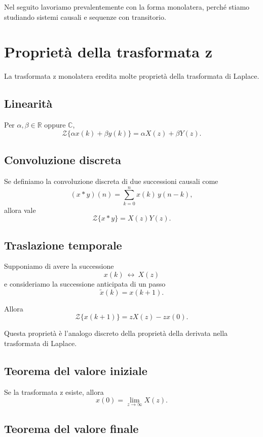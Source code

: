 Nel seguito lavoriamo prevalentemente con la forma monolatera, perch\'e stiamo studiando
sistemi causali e sequenze con transitorio.

\section{Propriet\`a della trasformata z}

La trasformata z monolatera eredita molte propriet\`a della trasformata di Laplace.

\subsection{Linearit\`a}

Per \(\alpha,\beta\in\mathbb{R}\) oppure \(\mathbb{C}\),
\[
\mathcal{Z}\{\alpha x(k)+\beta y(k)\}
=
\alpha X(z)+\beta Y(z).
\]

\subsection{Convoluzione discreta}

Se definiamo la convoluzione discreta di due successioni causali come
\[
(x\ast y)(n)=\sum_{k=0}^{n} x(k)\,y(n-k),
\]
allora vale
\[
\mathcal{Z}\{x\ast y\}=X(z)Y(z).
\]

\subsection{Traslazione temporale}

Supponiamo di avere la successione
\[
x(k)\ \longleftrightarrow\ X(z)
\]
e consideriamo la successione anticipata di un passo
\[
\tilde x(k)=x(k+1).
\]

Allora
\[
\mathcal{Z}\{x(k+1)\}=zX(z)-zx(0).
\]

Questa propriet\`a \`e l'analogo discreto della propriet\`a della derivata
nella trasformata di Laplace.

\subsection{Teorema del valore iniziale}

Se la trasformata z esiste, allora
\[
x(0)=\lim_{z\to\infty} X(z).
\]

\subsection{Teorema del valore finale}

